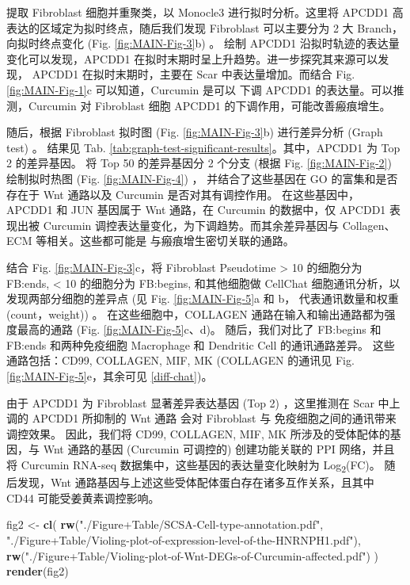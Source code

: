 \documentclass[
]{article}
\newenvironment{Shaded}{\begin{snugshade}}{\end{snugshade}}
\newcommand{\KeywordTok}[1]{\textcolor[rgb]{0.13,0.29,0.53}{\textbf{#1}}}
\newcommand{\NormalTok}[1]{#1}
\newcommand{\StringTok}[1]{\textcolor[rgb]{0.31,0.60,0.02}{#1}}
\begin{document}
提取 Fibroblast 细胞并重聚类，以 Monocle3 进行拟时分析。这里将 APCDD1 高表达的区域定为拟时终点，随后我们发现
Fibroblast 可以主要分为 2 大 Branch，向拟时终点变化 (Fig. \ref{fig:MAIN-Fig-3}b) 。
绘制 APCDD1 沿拟时轨迹的表达量变化可以发现，APCDD1 在拟时末期时呈上升趋势。进一步探究其来源可以发现，
APCDD1 在拟时末期时，主要在 Scar 中表达量增加。而结合 Fig. \ref{fig:MAIN-Fig-1}c 可以知道，Curcumin 是可以
下调 APCDD1 的表达量。可以推测，Curcumin 对 Fibroblast 细胞 APCDD1 的下调作用，可能改善瘢痕增生。

随后，根据 Fibroblast 拟时图 (Fig. \ref{fig:MAIN-Fig-3}b) 进行差异分析 (Graph test) 。
结果见 Tab. \ref{tab:graph-test-significant-results}。其中，APCDD1 为 Top 2 的差异基因。
将 Top 50 的差异基因分 2 个分支 (根据 Fig. \ref{fig:MAIN-Fig-2}) 绘制拟时热图 (Fig. \ref{fig:MAIN-Fig-4}) ，
并结合了这些基因在 GO 的富集和是否存在于 Wnt 通路以及 Curcumin 是否对其有调控作用。
在这些基因中，APCDD1 和 JUN 基因属于 Wnt 通路，在 Curcumin 的数据中，仅 APCDD1 表现出被
Curcumin 调控表达量变化，为下调趋势。而其余差异基因与 Collagen、ECM 等相关。这些都可能是
与瘢痕增生密切关联的通路。

结合 Fig. \ref{fig:MAIN-Fig-3}c，将 Fibroblast Pseudotime \textgreater{} 10 的细胞分为 FB:ends, \textless{} 10 的细胞分为
FB:begins, 和其他细胞做 CellChat 细胞通讯分析，以发现两部分细胞的差异点 (见 Fig. \ref{fig:MAIN-Fig-5}a 和 b，
代表通讯数量和权重 (count，weight)) 。
在这些细胞中，COLLAGEN 通路在输入和输出通路都为强度最高的通路 (Fig. \ref{fig:MAIN-Fig-5}c、d)。
随后，我们对比了 FB:begins 和 FB:ends 和两种免疫细胞 Macrophage 和 Dendritic Cell 的通讯通路差异。
这些通路包括：CD99, COLLAGEN, MIF, MK (COLLAGEN 的通讯见 Fig. \ref{fig:MAIN-Fig-5}e，其余可见 \ref{diff-chat})。

由于 APCDD1 为 Fibroblast 显著差异表达基因 (Top 2) ，这里推测在 Scar 中上调的 APCDD1 所抑制的 Wnt 通路
会对 Fibroblast 与 免疫细胞之间的通讯带来调控效果。
因此，我们将 CD99, COLLAGEN, MIF, MK 所涉及的受体配体的基因，与 Wnt 通路的基因 (Curcumin 可调控的)
创建功能关联的 PPI 网络，并且将 Curcumin RNA-seq 数据集中，这些基因的表达量变化映射为 Log\textsubscript{2}(FC)。
随后发现，Wnt 通路基因与上述这些受体配体蛋白存在诸多互作关系，且其中 CD44 可能受姜黄素调控影响。

\begin{Shaded}
\begin{Highlighting}[]
\NormalTok{fig2 \textless{}{-}}\StringTok{ }\KeywordTok{cl}\NormalTok{(}
  \KeywordTok{rw}\NormalTok{(}\StringTok{"./Figure+Table/SCSA{-}Cell{-}type{-}annotation.pdf"}\NormalTok{,}
    \StringTok{"./Figure+Table/Violing{-}plot{-}of{-}expression{-}level{-}of{-}the{-}HNRNPH1.pdf"}\NormalTok{),}
  \KeywordTok{rw}\NormalTok{(}\StringTok{"./Figure+Table/Violing{-}plot{-}of{-}Wnt{-}DEGs{-}of{-}Curcumin{-}affected.pdf"}\NormalTok{)}
\NormalTok{)}
\KeywordTok{render}\NormalTok{(fig2)}
\end{Highlighting}
\end{Shaded}
\end{document}

